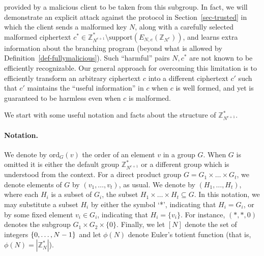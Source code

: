 \documentclass[11pt]{article}
\newcommand{\encdj}{{E}_{N,e}}
\newcommand{\Z}{\mathbb{Z}}
\newcommand{\U}[1]{\mathbb{Z}_{#1}^*}
\newcommand\ot{\mbox{OT}\xspace}
\newcommand{\plain}{{{M}}}
\newcommand{\plaintext}[1]{\plain_{#1}}
\newcommand{\mathify}[1]{\ifmmode{#1}\else\mbox{$#1$}\fi}
\newcommand{\set}[2][]{\mathify{{\left\{#2\right\}}^{#1}}}
\newcommand{\opbrange}[3][,]{#2#1\ldots#1#3}
\newcommand{\order}{{\mathrm{ord}}}
\newcommand{\support}{{\mathrm{support}}}
\begin{document}
provided by a malicious client to be taken from this subgroup. In
fact, we will demonstrate an explicit attack against the protocol
in Section~\ref{sec-trusted} in which the client sends a malformed
key $N$, along with a carefully selected malformed ciphertext
$c^*\in \U{N^{e+1}}\setminus \support(\encdj(\Z_{N^e}))$, and
learns extra information about the branching program (beyond what
is allowed by Definition~\ref{def-fullymalicious}). Such
``harmful'' pairs $N,c^*$ are not known to be efficiently
recognizable. Our general approach for overcoming this limitation
is to efficiently transform an arbitrary ciphertext $c$ into a
different ciphertext $c'$ such that $c'$ maintains the ``useful
information'' in $c$ when $c$ is well formed, and yet is guaranteed
to be harmless even when $c$ is malformed.

\medskip

We start with some useful notation and facts about the structure of
$\U{N^{e+1}}$.

\paragraph{Notation.} We denote by $\order_G(v)$ the order of an
element $v$ in a group $G$. When $G$ is omitted it is either the
default group $\U{N^{e+1}}$ or a different group which is
understood from the context. For a direct product group
$G=\opbrange[\times]{G_1}{G_t}$, we denote elements of $G$ by
$(\opbrange{v_1}{v_t})$, as usual.
We denote by $(\opbrange{H_1}{H_t})$, where each
$H_i$ is a subset of $G_i$, the subset
$\opbrange[\times]{H_1}{H_t}\subseteq G$. In this notation, we may
substitute a subset $H_i$ by either the symbol `*', indicating that
$H_i=G_i$, or by some fixed element $v_i\in G_i$, indicating that
$H_i=\{v_i\}$. For instance, $(*,*,0)$ denotes the subgroup
$G_1\times G_2\times \{0\}$. Finally, we let $[N]$ denote the set
of integers $\set{\opbrange{0}{N-1}}$ and let $\phi(N)$ denote
Euler's totient function (that is, $\phi(N)=|\U{N}|$).
\end{document}
